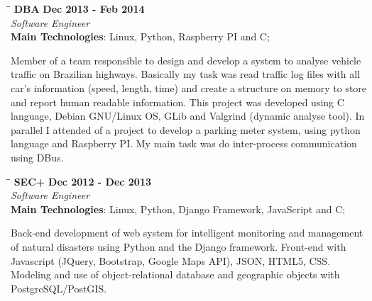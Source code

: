 \documentclass[margin]{res}
\begin{document}
\begin{resume}
\vspace{-0.1in}
   \begin{tabbing}
   \hspace{2.3in}\= \hspace{1.7in}\= \kill %
    \textbf{DBA}    \>\>\textbf{Dec 2013 - Feb 2014}\\
    \textit{Software Engineer}\\        
    \textbf{Main Technologies}: Linux, Python, Raspberry PI and C;
   \end{tabbing}\vspace{-20pt}      %
    \vspace{2mm}
        Member of a team responsible to design and develop a system to analyse vehicle traffic on Brazilian highways. 
        Basically my task was read traffic log files with all car's information (speed, length, time) and create a structure
        on memory to store and report human readable information. This project was developed using C language, Debian GNU/Linux OS,
        GLib and Valgrind (dynamic analyse tool). 
        In parallel I attended of a project to develop a parking meter system, using python language and Raspberry PI. My main task
        was do inter-process communication using DBus.
\vspace{-0.1in}
   \begin{tabbing}
   \hspace{2.3in}\= \hspace{1.7in}\= \kill %
    \textbf{SEC+}    \>\>\textbf{Dec 2012 - Dec 2013}\\
    \textit{Software Engineer}\\        
    \textbf{Main Technologies}: Linux, Python, Django Framework, JavaScript and C;
   \end{tabbing}\vspace{-20pt}      %
    \vspace{2mm}
     Back-end development of web system for intelligent monitoring and management of natural disasters
     using Python and the Django framework. Front-end with Javascript (JQuery, Bootstrap, Google Maps API),
     JSON, HTML5, CSS. Modeling and use of object-relational database and geographic objects with
     PostgreSQL/PostGIS.


\end{resume}
\end{document}
